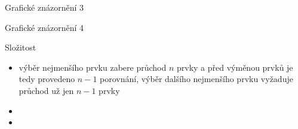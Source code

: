 \documentclass{beamer}
\begin{document}
\begin{frame}{Grafické znázornění 3}
\begin{center}
\end{center}
\end{frame}

\begin{frame}{Grafické znázornění 4}
\begin{center}
\end{center}
\end{frame}


\begin{frame}{Složitost}
\begin{itemize}
\item výběr nejmenšího prvku zabere průchod $n$ prvky a před výměnou prvků je tedy provedeno $n-1$ porovnání, výběr dalšího nejmenšího prvku vyžaduje průchod už jen $n-1$ prvky
\item {}
\item {}
\end{itemize}
\end{frame}
\end{document}

